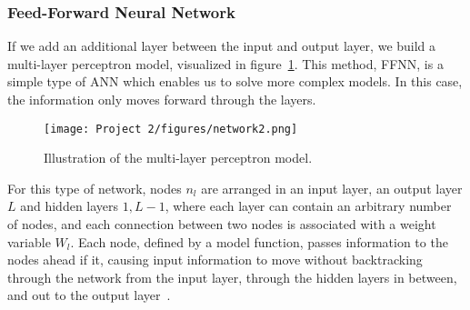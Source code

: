 \documentclass[english,notitlepage,reprint,nofootinbib]{revtex4-2}  %
\begin{document}
\subsubsection*{Feed-Forward Neural Network}
If we add an additional layer between the input and output layer, we build a multi-layer perceptron model, visualized in figure~\ref{fig: Multi Layer Perceptron Model}. This method, FFNN, is a simple type of ANN which enables us to solve more complex models. In this case, the information only moves forward through the layers. %

\begin{figure}[h!]
    \centering %
    \texttt{[image: Project 2/figures/network2.png]} 
    \caption{Illustration of the multi-layer perceptron model.}
    \label{fig: Multi Layer Perceptron Model}
\end{figure}

For this type of network, nodes $n_l$ are arranged in an input layer, an output layer $L$ and hidden layers $1,L-1$, where each layer can contain an arbitrary number of nodes, and each connection between two nodes is associated with a weight variable $W_l$. 
Each node, defined by a model function, passes information to the nodes ahead if it, causing input information to move without backtracking through the network from the input layer, through the hidden layers in between, and out to the output layer~\cite{friedman}. 
\end{document}
